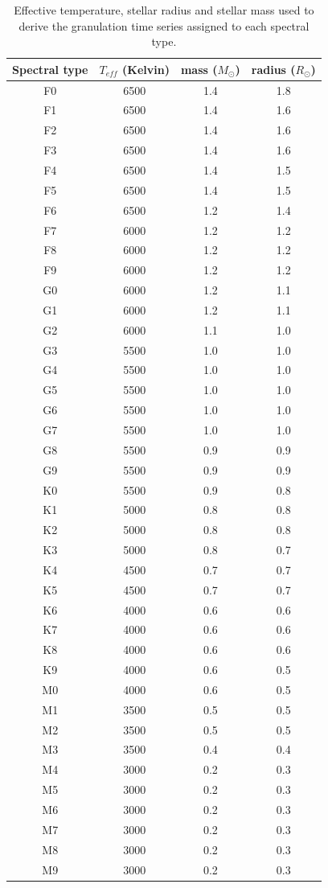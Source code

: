 \documentclass[11pt]{article}      %
\begin{document}
\begin{table}[hb]
  \begin{center}
  \caption{Effective temperature, stellar radius and stellar mass used to derive the granulation time series assigned to each spectral type.}
  \begin{tabular}{| c | c | c | c |}
    \hline 
    Spectral type & $T_{eff}$ (Kelvin) & mass ($M_{\odot}$) & radius ($R_{\odot}$)\\
    \hline
F0 & 6500 & 1.4 & 1.8 \\
F1 & 6500 & 1.4 & 1.6 \\
F2 & 6500 & 1.4 & 1.6 \\
F3 & 6500 & 1.4 & 1.6 \\
F4 & 6500 & 1.4 & 1.5 \\
F5 & 6500 & 1.4 & 1.5 \\
F6 & 6500 & 1.2 & 1.4 \\
F7 & 6000 & 1.2 & 1.2 \\
F8 & 6000 & 1.2 & 1.2 \\
F9 & 6000 & 1.2 & 1.2 \\
G0 & 6000 & 1.2 & 1.1 \\
G1 & 6000 & 1.2 & 1.1 \\
G2 & 6000 & 1.1 & 1.0 \\
G3 & 5500 & 1.0 & 1.0 \\
G4 & 5500 & 1.0 & 1.0 \\
G5 & 5500 & 1.0 & 1.0 \\
G6 & 5500 & 1.0 & 1.0 \\
G7 & 5500 & 1.0 & 1.0 \\
G8 & 5500 & 0.9 & 0.9 \\
G9 & 5500 & 0.9 & 0.9 \\
K0 & 5500 & 0.9 & 0.8 \\
K1 & 5000 & 0.8 & 0.8 \\
K2 & 5000 & 0.8 & 0.8 \\
K3 & 5000 & 0.8 & 0.7 \\
K4 & 4500 & 0.7 & 0.7 \\
K5 & 4500 & 0.7 & 0.7 \\
K6 & 4000 & 0.6 & 0.6 \\
K7 & 4000 & 0.6 & 0.6 \\
K8 & 4000 & 0.6 & 0.6 \\
K9 & 4000 & 0.6 & 0.5 \\
M0 & 4000 & 0.6 & 0.5 \\
M1 & 3500 & 0.5 & 0.5 \\
M2 & 3500 & 0.5 & 0.5 \\
M3 & 3500 & 0.4 & 0.4 \\
M4 & 3000 & 0.2 & 0.3 \\
M5 & 3000 & 0.2 & 0.3 \\
M6 & 3000 & 0.2 & 0.3 \\
M7 & 3000 & 0.2 & 0.3 \\
M8 & 3000 & 0.2 & 0.3 \\
M9 & 3000 & 0.2 & 0.3 \\
    \hline
  \end{tabular}
  \label{tab:granulation_params}
  \end{center}
\end{table}
\end{document}
